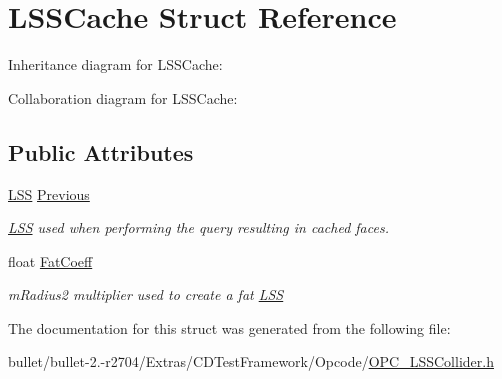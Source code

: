 \hypertarget{struct_l_s_s_cache}{\section{L\+S\+S\+Cache Struct Reference}
\label{struct_l_s_s_cache}
}


Inheritance diagram for L\+S\+S\+Cache\+:


Collaboration diagram for L\+S\+S\+Cache\+:
\subsection*{Public Attributes}
\begin{DoxyCompactItemize}
\item 
\hypertarget{struct_l_s_s_cache_aa617d0f11615d556a68be403a71ca425}{\hyperlink{class_l_s_s}{L\+S\+S} \hyperlink{struct_l_s_s_cache_aa617d0f11615d556a68be403a71ca425}{Previous}}\label{struct_l_s_s_cache_aa617d0f11615d556a68be403a71ca425}

\begin{DoxyCompactList}\small\item\em \hyperlink{class_l_s_s}{L\+S\+S} used when performing the query resulting in cached faces. \end{DoxyCompactList}\item 
\hypertarget{struct_l_s_s_cache_ad0b07b928f1fd59a62fb1491b5048192}{float \hyperlink{struct_l_s_s_cache_ad0b07b928f1fd59a62fb1491b5048192}{Fat\+Coeff}}\label{struct_l_s_s_cache_ad0b07b928f1fd59a62fb1491b5048192}

\begin{DoxyCompactList}\small\item\em m\+Radius2 multiplier used to create a fat \hyperlink{class_l_s_s}{L\+S\+S} \end{DoxyCompactList}\end{DoxyCompactItemize}


The documentation for this struct was generated from the following file\+:\begin{DoxyCompactItemize}
\item 
bullet/bullet-\/2.-\/r2704/\+Extras/\+C\+D\+Test\+Framework/\+Opcode/\hyperlink{_o_p_c___l_s_s_collider_8h}{O\+P\+C\+\_\+\+L\+S\+S\+Collider.\+h}\end{DoxyCompactItemize}
